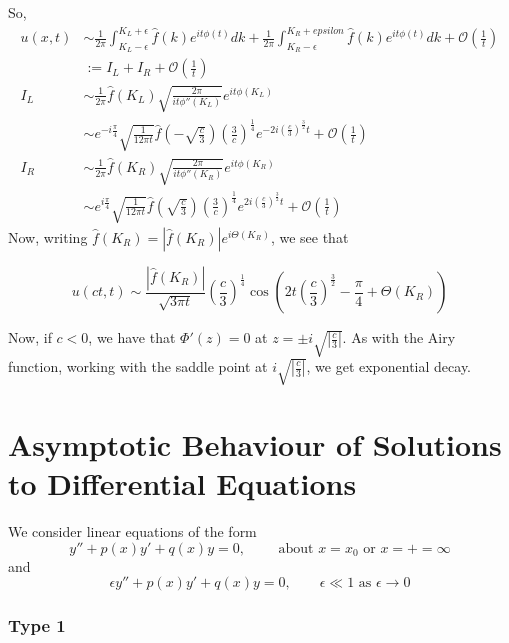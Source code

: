 \documentclass[a4paper]{article}
\begin{document}
\begin{eg}
	So,
	\begin{align*}
		u(x,t) &\sim \frac{1}{2\pi} \int_{K_L - \epsilon}^{K_L + \epsilon} \hat{f}(k) e^{it\phi(t)} dk + \frac{1}{2\pi} \int_{K_R - \epsilon}^{K_R + epsilon} \hat{f}(k) e^{it\phi(t)} dk + \mathcal{O}\left(\frac{1}{t}\right) \\
		&:= I_L + I_R + \mathcal{O}\left( \frac{1}{t} \right) \\
		I_L &\sim \frac{1}{2\pi} \hat{f}(K_L) \sqrt{\frac{2\pi}{it \phi''(K_L)}} e^{it\phi(K_L)} \\
		&\sim e^{-i\frac{\pi}{4}}\sqrt{\frac{1}{12 \pi t}} \hat{f}\left(-\sqrt{\frac{c}{3}}\right) \left(\frac{3}{c}\right)^{\frac{1}{4}} e^{-2i \left( \frac{c}{3} \right)^{\frac{3}{2}} t} + \mathcal{O}\left( \frac{1}{t} \right) \\
		I_R &\sim \frac{1}{2\pi} \hat{f}(K_R) \sqrt{\frac{2\pi}{it \phi''(K_R)}} e^{it\phi(K_R)} \\
		&\sim e^{i\frac{\pi}{4}} \sqrt{\frac{1}{12\pi t}} \hat{f}\left(\sqrt{\frac{c}{3}}\right) \left(\frac{3}{c}\right)^{\frac{1}{4}} e^{2i \left( \frac{c}{3} \right)^{\frac{3}{2}}t } + \mathcal{O}\left( \frac{1}{t} \right) 
	\end{align*}
	Now, writing $\hat{f}(K_R) = |\hat{f}(K_R)|e^{i\Theta (K_R)}$, we see that

	\[
		u(ct, t) \sim \frac{|\hat{f}(K_R)|}{\sqrt{3  \pi t}} \left( \frac{c}{3} \right)^{\frac{1}{4}} \cos\left( 2t\left( \frac{c}{3} \right)^{\frac{3}{2}}  - \frac{\pi}{4} + \Theta(K_R) \right)  
	\] 

	Now, if $c < 0$, we have that  $\Phi'(z) = 0$ at $z = \pm i \sqrt{\left|\frac{c}{3} \right|} $. As with the Airy function, working with the saddle point at $i \sqrt{\left|\frac{c}{3} \right|}$, we get exponential decay.
\end{eg}

\section{Asymptotic Behaviour of Solutions to Differential Equations}

We consider linear equations of the form
\[
	y'' + p(x)y' + q(x)y = 0, \qquad \text{ about } x = x_0 \text{ or } x = +=\infty
\] 
and
\[
	\epsilon y'' + p(x) y' + q(x) y = 0, \qquad \epsilon \ll 1 \text{ as } \epsilon \to 0
\] 

\subsubsection*{Type 1}
\end{document}
